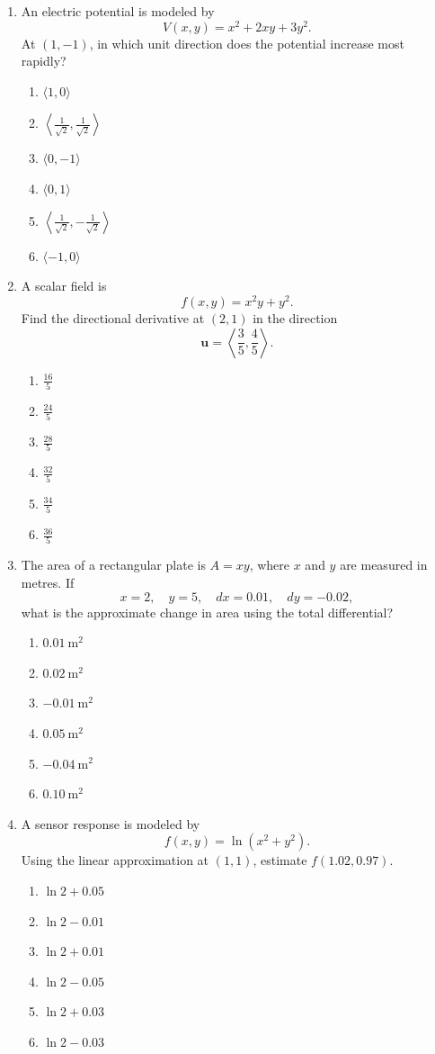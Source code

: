 \documentclass[a4paper,12pt]{article}
\theoremstyle{mystyle}
\numberwithin{equation}{section}
\numberwithin{theorem}{section}
\numberwithin{proposition}{section}
\numberwithin{example}{section}
\numberwithin{remark}{section}
\numberwithin{lemma}{section}
\numberwithin{corollary}{section}
\numberwithin{definition}{section}
\begin{document}
\begin{enumerate}[label=\textbf{Question \arabic*.},leftmargin=*]
\item An electric potential is modeled by
\[
V(x,y)=x^2+2xy+3y^2.
\]
At \((1,-1)\), in which unit direction does the potential increase
most rapidly?
\begin{enumerate}[label=(\Alph*)]
\item \(\langle1,0\rangle\)
\item \(\left\langle\frac1{\sqrt2},\frac1{\sqrt2}\right\rangle\)
\item \(\langle0,-1\rangle\)
\item \(\langle0,1\rangle\)
\item \(\left\langle\frac1{\sqrt2},-\frac1{\sqrt2}\right\rangle\)
\item \(\langle-1,0\rangle\)
\end{enumerate}

\item A scalar field is
\[
f(x,y)=x^2y+y^2.
\]
Find the directional derivative at \((2,1)\) in the direction
\[
\mathbf{u}=\left\langle\frac35,\frac45\right\rangle.
\]
\begin{enumerate}[label=(\Alph*)]
\item \(\frac{16}{5}\)
\item \(\frac{24}{5}\)
\item \(\frac{28}{5}\)
\item \(\frac{32}{5}\)
\item \(\frac{34}{5}\)
\item \(\frac{36}{5}\)
\end{enumerate}

\item The area of a rectangular plate is \(A=xy\), where \(x\) and
\(y\) are measured in metres. If
\[
x=2,\quad y=5,\quad dx=0.01,\quad dy=-0.02,
\]
what is the approximate change in area using the total differential?
\begin{enumerate}[label=(\Alph*)]
\item \(0.01\ \mathrm{m}^2\)
\item \(0.02\ \mathrm{m}^2\)
\item \(-0.01\ \mathrm{m}^2\)
\item \(0.05\ \mathrm{m}^2\)
\item \(-0.04\ \mathrm{m}^2\)
\item \(0.10\ \mathrm{m}^2\)
\end{enumerate}

\item A sensor response is modeled by
\[
f(x,y)=\ln(x^2+y^2).
\]
Using the linear approximation at \((1,1)\), estimate
\(f(1.02,0.97)\).
\begin{enumerate}[label=(\Alph*)]
\item \(\ln2+0.05\)
\item \(\ln2-0.01\)
\item \(\ln2+0.01\)
\item \(\ln2-0.05\)
\item \(\ln2+0.03\)
\item \(\ln2-0.03\)
\end{enumerate}


\end{enumerate}
\end{document}
